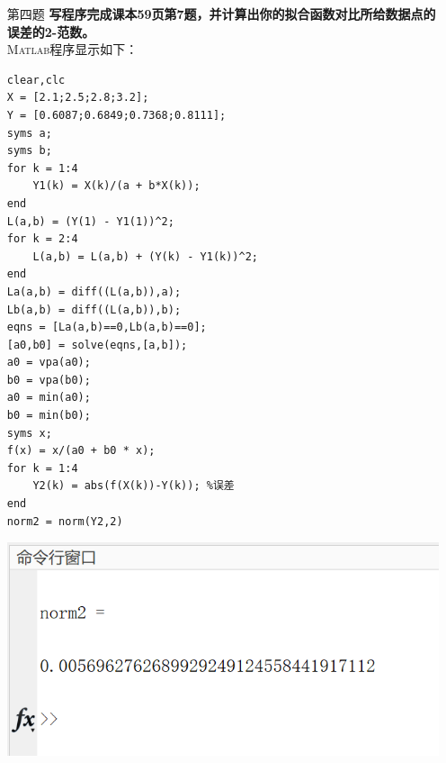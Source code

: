 \documentclass[12pt,a4paper,UTF8]{ctexart}
\begin{document}
\begin{enumerate}
\item[第四题] \textbf{写程序完成课本59页第7题，并计算出你的拟合函数对比所给数据点的
误差的2-范数。}
\\ 
\textsc{Matlab}程序显示如下：
\begin{lstlisting}[frame=single]
    clear,clc
X = [2.1;2.5;2.8;3.2];
Y = [0.6087;0.6849;0.7368;0.8111];
syms a;
syms b;
for k = 1:4
    Y1(k) = X(k)/(a + b*X(k));
end
L(a,b) = (Y(1) - Y1(1))^2;
for k = 2:4
    L(a,b) = L(a,b) + (Y(k) - Y1(k))^2;
end
La(a,b) = diff((L(a,b)),a);
Lb(a,b) = diff((L(a,b)),b);
eqns = [La(a,b)==0,Lb(a,b)==0];
[a0,b0] = solve(eqns,[a,b]);
a0 = vpa(a0);
b0 = vpa(b0);
a0 = min(a0);
b0 = min(b0);
syms x;
f(x) = x/(a0 + b0 * x);
for k = 1:4
    Y2(k) = abs(f(X(k))-Y(k)); %误差
end
norm2 = norm(Y2,2)
\end{lstlisting}
\begin{center}
\includegraphics[scale=0.6]{4.png}\\
\end{center}
\end{enumerate}
\end{document}
